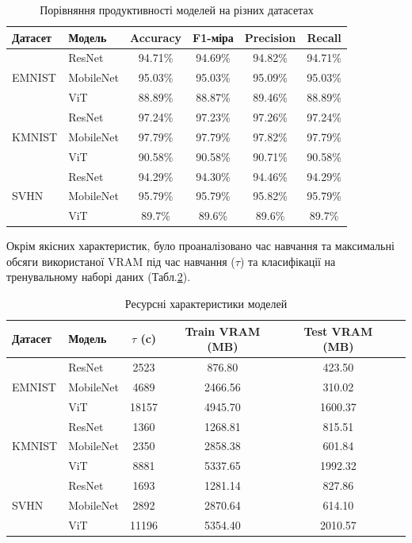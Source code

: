 \documentclass[14pt,a4paper]{extarticle}
\begin{document}
\begin{table}[h!]
\centering
\caption{Порівняння продуктивності моделей на різних датасетах}
\label{tab:metrics_all}
\begin{tabular}{llcccc}
\toprule
Датасет & Модель & Accuracy & F1-міра & Precision & Recall \\
\midrule
\multirow{3}{*}{EMNIST} 
  & ResNet & 94.71\% & 94.69\% & 94.82\% & 94.71\% \\
  & MobileNet & 95.03\% & 95.03\% & 95.09\% & 95.03\% \\
  & ViT & 88.89\% & 88.87\% & 89.46\% & 88.89\% \\
\midrule
\multirow{3}{*}{KMNIST}
  & ResNet & 97.24\% & 97.23\% & 97.26\% & 97.24\% \\
  & MobileNet & 97.79\% & 97.79\% & 97.82\% & 97.79\% \\
  & ViT & 90.58\% & 90.58\% & 90.71\% & 90.58\% \\
\midrule
\multirow{3}{*}{SVHN}
  & ResNet & 94.29\% & 94.30\% & 94.46\% & 94.29\% \\
  & MobileNet & 95.79\% & 95.79\% & 95.82\% & 95.79\% \\
  & ViT & 89.7\% & 89.6\% & 89.6\% & 89.7\% \\
\bottomrule
\end{tabular}
\end{table}

Окрім якісних характеристик, було проаналізовано час навчання та максимальні обсяги використаної VRAM під час навчання ($\tau$) та класифікації на тренувальному наборі даних (Табл.\ref{tab:resources}).

\begin{table}[h!]
\centering
\caption{Ресурсні характеристики моделей}
\label{tab:resources}
\begin{tabular}{llcccc}
\toprule 
Датасет & Модель & $\tau$ (c) & Train VRAM (MB) & Test VRAM (MB) \\
\midrule
\multirow{3}{*}{EMNIST} 
  & ResNet & 2523 & 876.80 & 423.50 \\
  & MobileNet & 4689 & 2466.56 & 310.02 \\
  & ViT & 18157 & 4945.70 & 1600.37 \\
\midrule
\multirow{3}{*}{KMNIST}
  & ResNet & 1360 & 1268.81 & 815.51 \\
  & MobileNet & 2350 & 2858.38 & 601.84 \\
  & ViT & 8881 & 5337.65 & 1992.32 \\
\midrule
\multirow{3}{*}{SVHN}
  & ResNet & 1693 & 1281.14 & 827.86 \\
  & MobileNet & 2892 & 2870.64 & 614.10 \\
  & ViT & 11196 & 5354.40 & 2010.57 \\
\bottomrule
\end{tabular}
\end{table}
\end{document}

